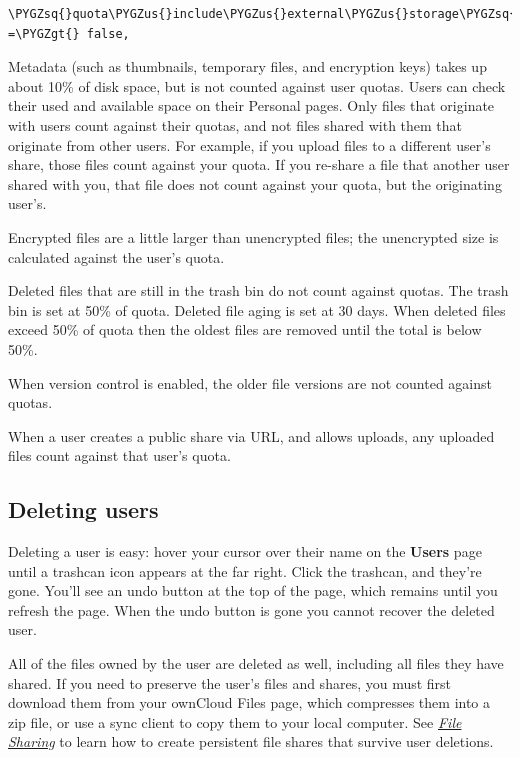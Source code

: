 \documentclass[letterpaper,10pt,english]{sphinxmanual}
\def\PYGZus{\char`\_}
\def\PYGZgt{\char`\>}
\def\PYGZsq{\char`\'}
\renewcommand\PYGZsq{\textquotesingle}
\begin{document}
\begin{Verbatim}[commandchars=\\\{\}]
\PYGZsq{}quota\PYGZus{}include\PYGZus{}external\PYGZus{}storage\PYGZsq{} =\PYGZgt{} false,
\end{Verbatim}

Metadata (such as thumbnails, temporary files, and encryption keys) takes up
about 10\% of disk space, but is not counted against user quotas. Users can check
their used and available space on their Personal pages. Only files that
originate with users count against their quotas, and not files shared with them
that originate from other users. For example, if you upload files to a
different user's share, those files count against your quota. If you re-share a
file that another user shared with you, that file does not count against your
quota, but the originating user's.

Encrypted files are a little larger than unencrypted files; the unencrypted size
is calculated against the user's quota.

Deleted files that are still in the trash bin do not count against quotas. The
trash bin is set at 50\% of quota. Deleted file aging is set at 30 days. When
deleted files exceed 50\% of quota then the oldest files are removed until the
total is below 50\%.

When version control is enabled, the older file versions are not counted
against quotas.

When a user creates a public share via URL, and allows uploads, any uploaded
files count against that user's quota.


\subsection{Deleting users}
\label{configuration_user/user_configuration:deleting-users}
Deleting a user is easy: hover your cursor over their name on the \textbf{Users} page
until a trashcan icon appears at the far right. Click the trashcan, and they're
gone. You'll see an undo button at the top of the page, which remains until you
refresh the page. When the undo button is gone you cannot recover the deleted
user.

All of the files owned by the user are deleted as well, including all files they
have shared. If you need to preserve the user's files and shares, you must first
download them from your ownCloud Files page, which compresses them into a zip
file, or use a sync client to copy them to your local computer. See
{\hyperref[configuration_files/file_sharing_configuration::doc]{\emph{\emph{File Sharing}}}} to learn how to create
persistent file shares that survive user deletions.
\end{document}
